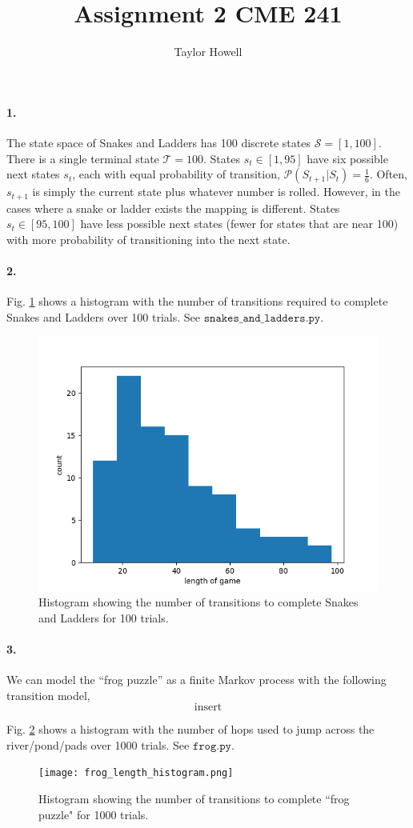 \documentclass[12pt]{article}
\title{Assignment 2 CME 241}
\author{Taylor Howell}
\begin{document}
\maketitle

\paragraph{1.}
The state space of Snakes and Ladders has 100 discrete states $\mathcal{S} = [1, 100]$. There is a single terminal state $\mathcal{T} = 100$. States $s_t \in [1, 95]$ have six possible next states $s_t$, each with equal probability of transition, $\mathcal{P}(S_{t+1} | S_t) = \frac{1}{6}$. Often, $s_{t+1}$ is simply the current state plus whatever number is rolled. However, in the cases where a snake or ladder exists the mapping is different. States $s_t \in [95, 100]$ have less possible next states (fewer for states that are near 100) with more probability of transitioning into the next state.

\paragraph{2.}
Fig. \ref{snakes_and_ladders} shows a histogram with the number of transitions required to complete Snakes and Ladders over 100 trials. See $\texttt{snakes\_and\_ladders.py}$. 
\begin{figure}[h]
	\centering
	\includegraphics[width=.5\textwidth]{snakes_and_ladders_length_histogram.png}
	\caption{Histogram showing the number of transitions to complete Snakes and Ladders for 100 trials.}
	\label{snakes_and_ladders}
\end{figure}

\paragraph{3.}
We can model the ``frog puzzle'' as a finite Markov process with the following transition model,
$$ \text{insert} $$

Fig. \ref{frog_puzzle} shows a histogram with the number of hops used to jump across the river/pond/pads over 1000 trials. See $\texttt{frog.py}$.
\begin{figure}
	\centering
	\texttt{[image: frog\_length\_histogram.png]}
	\caption{Histogram showing the number of transitions to complete ``frog puzzle" for 1000 trials.}
	\label{frog_puzzle}
\end{figure}
\end{document}
